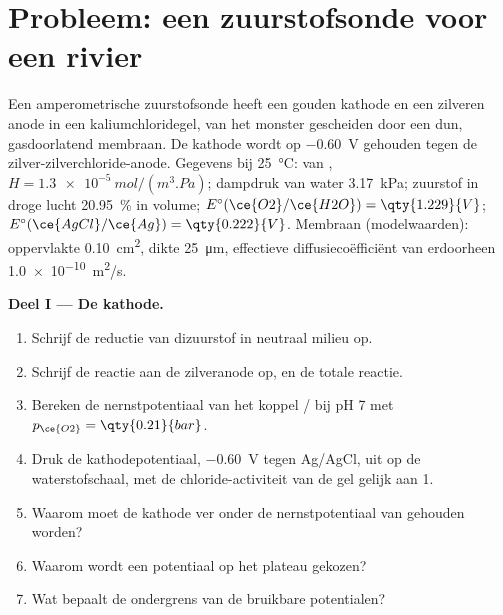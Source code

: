 \section{Probleem: een zuurstofsonde voor een rivier}

\begin{problem}
\label{pb:b2:current-potential-curves:1}
Een amperometrische zuurstofsonde heeft een gouden kathode en een zilveren anode in een
kaliumchloridegel, van het monster gescheiden door een dun, gasdoorlatend
membraan. De kathode wordt op \qty{-0.60}{V} gehouden tegen de zilver-zilverchloride-anode.
Gegevens bij \qty{25}{\degreeCelsius}:  van
, $H = \qty{1.3e-5}{mol/(m^3.Pa)}$; dampdruk van water
\qty{3.17}{kPa}; zuurstof in droge lucht 20.95~\% in volume; $E^\circ(\ce{O2}/\ce{H2O}) =
\qty{1.229}{V}$; $E^\circ(\ce{AgCl}/\ce{Ag}) = \qty{0.222}{V}$. Membraan (modelwaarden):
oppervlakte \qty{0.10}{cm^2}, dikte \qty{25}{\micro m}, effectieve
diffusiecoëfficiënt van  erdoorheen \qty{1.0e-10}{m^2/s}.

\medskip
\noindent\textbf{Deel I --- De kathode.}
\begin{enumerate}
  \item Schrijf de reductie van dizuurstof in neutraal milieu op.
  \item Schrijf de reactie aan de zilveranode op, en de totale reactie.
  \item Bereken de nernstpotentiaal van het koppel / bij pH 7 met
        $p_{\ce{O2}} = \qty{0.21}{bar}$.
  \item Druk de kathodepotentiaal, \qty{-0.60}{V} tegen Ag/AgCl, uit op de
        waterstofschaal, met de chloride-activiteit van de gel gelijk aan 1.
  \item Waarom moet de kathode ver onder de nernstpotentiaal van
         gehouden worden?
  \item Waarom wordt een potentiaal op het plateau gekozen?
  \item Wat bepaalt de ondergrens van de bruikbare potentialen?
\end{enumerate}


\end{problem}
